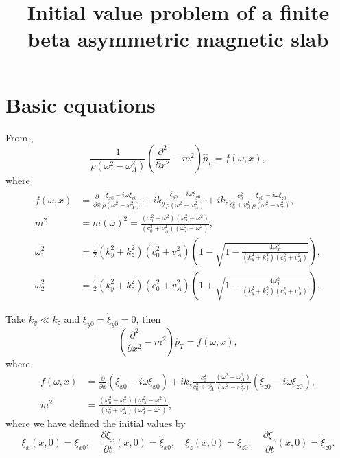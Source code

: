 \documentclass[12pt]{article}
\title{Initial value problem of a finite beta asymmetric magnetic slab}
\date{}
\begin{document}
\maketitle


\section{Basic equations}
From \cite{and_etal07},
\begin{equation}
\frac{1}{\rho(\omega^2 - \omega_A^2)} \left( \frac{\partial^2}{\partial x^2} - m^2 \right) \hat{p}_T = f(\omega, x),
\end{equation}
where
\begin{align}
f(\omega, x) &= \frac{\partial}{\partial x} \frac{\dot{\xi}_{x0} - i\omega\xi_{x0}}{\rho(\omega^2 - \omega_A^2)} + ik_y \frac{\dot{\xi}_{y0} - i\omega\xi_{y0}}{\rho(\omega^2 - \omega_A^2)} + ik_z \frac{c_0^2}{c_0^2 + v_A^2} \frac{\dot{\xi}_{z0} - i\omega\xi_{z0}}{\rho(\omega^2 - \omega_T^2)}, \\
m^2 &= m(\omega)^2 = \frac{(\omega_1^2 - \omega^2)(\omega_2^2 - \omega^2)}{(c_0^2 + v_A^2)(\omega_T^2 - \omega^2)}, \\
\omega_1^2 &= \frac{1}{2}(k_y^2 + k_z^2)(c_0^2 + v_A^2) \left( 1 - \sqrt{1 - \frac{4\omega_T^2}{(k_y^2 + k_z^2)(c_0^2 + v_A^2)}} \right), \\
\omega_2^2 &= \frac{1}{2}(k_y^2 + k_z^2)(c_0^2 + v_A^2) \left( 1 + \sqrt{1 - \frac{4\omega_T^2}{(k_y^2 + k_z^2)(c_0^2 + v_A^2)}} \right).
\end{align}

Take $k_y \ll k_z$ and $\xi_{y0} = \dot{\xi}_{y0} = 0$, then
\begin{equation}
\left( \frac{\partial^2}{\partial x^2} - m^2 \right) \hat{p}_T = f(\omega, x),
\end{equation}
where
\begin{align}
f(\omega, x) &= \frac{\partial}{\partial x} (\dot{\xi}_{x0} - i\omega\xi_{x0}) + ik_z \frac{c_0^2}{c_0^2 + v_A^2} \frac{(\omega^2 - \omega_A^2)}{(\omega^2 - \omega_T^2)} (\dot{\xi}_{z0} - i\omega\xi_{z0}), \\
m^2 &= \frac{(\omega_0^2 - \omega^2)(\omega_A^2 - \omega^2)}{(c_0^2 + v_A^2)(\omega_T^2 - \omega^2)},
\end{align}
where we have defined the initial values by
\begin{equation}
\xi_x(x, 0) = \xi_{x0}, \quad \frac{\partial{}\xi_x}{\partial{t}}(x, 0) = \dot{\xi}_{x0}, \quad \xi_z(x, 0) = \xi_{z0}, \quad \frac{\partial{}\xi_z}{\partial{t}}(x, 0) = \dot{\xi}_{z0}.
\end{equation}
\end{document}
